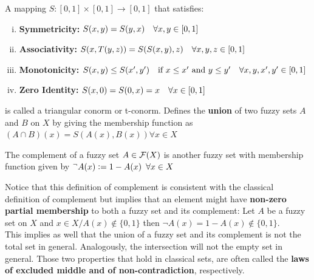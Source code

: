 
\begin{definition}
  A mapping $S:[0,1]\times [0,1] \longrightarrow [0,1]$ that satisfies:
  \begin{enumerate}[(i)]\setlength{\itemindent}{2em}
    \item \textbf{Symmetricity:} $S(x,y) = S(y,x) \quad \oldforall x,y \in [0,1]$
    \item \textbf{Associativity:} $S(x,T(y,z)) = S(S(x,y),z) \quad \oldforall x,y,z \in [0,1]$
    \item \textbf{Monotonicity:} $S(x,y) \leq S(x',y') \quad \textnormal{if }x\leq x' \textnormal{ and } y\leq y' \quad \oldforall x,y,x',y' \in [0,1]$
    \item \textbf{Zero Identity:} $S(x,0) = S(0,x) = x \quad \oldforall x \in [0,1]$
  \end{enumerate}
  is called a triangular conorm or t-conorm. Defines the \textbf{union} of two fuzzy sets $A$ and $B$ on $X$ by giving the membership function as $(A \cap  B) (x) = S(A(x),B(x)) \forall x \in X$ 
    
\end{definition}

\begin{definition}[Complement]
    The complement of a fuzzy set $A\in \mathcal{F}(X)$ is another fuzzy set with membership function given by $^\lnot A(x) \coleq 1 - A(x) \forall x\in X$
\end{definition}

Notice that this definition of complement is consistent with the classical definition of complement but implies that an element might have \textbf{non-zero partial membership} to both a fuzzy set and its complement: Let $A$ be a fuzzy set on $X$ and $x \in X / A(x)\notin \{0,1\}$ then $\lnot A(x)= 1 - A(x) \notin \{0,1\}$.\\

This implies as well that the union of a fuzzy set and its complement is not the total set in general. Analogously, the intersection will not the empty set in general. Those two properties that hold in classical sets, are often called the \textbf{laws of excluded middle and of non-contradiction}, respectively.\\

